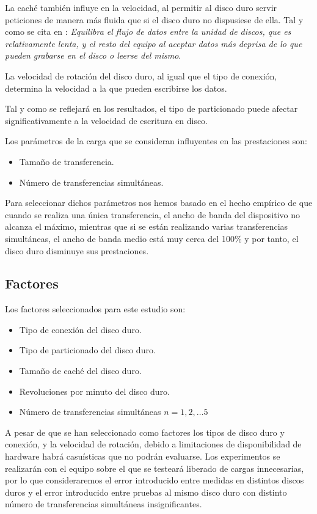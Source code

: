 \documentclass[a4paper,10pt]{article}
\begin{document}
La caché también influye en la velocidad, al permitir al disco duro servir peticiones de manera más fluida que si
el disco duro no dispusiese de ella. Tal y como se cita en \cite{cache}: \textit{Equilibra el flujo de datos entre la unidad de discos, 
que es relativamente lenta, y el resto del equipo al aceptar datos más deprisa de lo que pueden grabarse en el disco o leerse del mismo}.

La velocidad de rotación del disco duro, al igual que el tipo de conexión, determina la velocidad a la que pueden
escribirse los datos.

Tal y como se reflejará en los resultados, el tipo de particionado puede afectar significativamente a la velocidad de
escritura en disco.

Los parámetros de la carga que se consideran influyentes en las prestaciones son:
\begin{itemize}
 \item Tamaño de transferencia.
 \item Número de transferencias simultáneas.
\end{itemize}
Para seleccionar dichos parámetros nos hemos basado en el hecho empírico de que cuando se realiza una única transferencia,
el ancho de banda del dispositivo no alcanza el máximo, mientras que si se están realizando varias transferencias
simultáneas, el ancho de banda medio está muy cerca del 100\% y por tanto, el disco duro disminuye sus prestaciones.
\subsection{Factores}
Los factores seleccionados para este estudio son:
\begin{itemize}
 \item Tipo de conexión del disco duro.
 \item Tipo de particionado del disco duro.
 \item Tamaño de caché del disco duro.
 \item Revoluciones por minuto del disco duro.
 \item Número de transferencias simultáneas $n=1,2,\ldots5$
\end{itemize}
 A pesar de que se han seleccionado como factores los tipos de disco duro y conexión, y la velocidad de rotación, debido a 
 limitaciones de disponibilidad de hardware habrá casuísticas que no podrán evaluarse. Los
 experimentos se realizarán con el equipo sobre el que se testeará liberado de cargas innecesarias, por lo que consideraremos
 el error introducido entre medidas en distintos discos duros y el error introducido entre pruebas al mismo disco duro con distinto
 número de transferencias simultáneas insignificantes.
 
\end{document}

